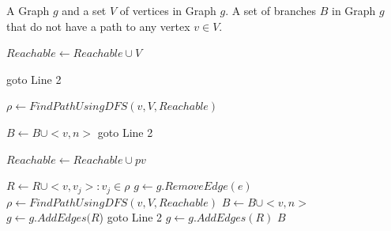 \newcommand{\UnrechableBranches}{\ensuremath{\mbox{\sc FindUnreachableBranches}}}
\begin{algorithm}[h!]
\caption{$FindUnreachableBranches(g, V)$}\label{alg:irrelavantBranches}
\begin{algorithmic}[1]
\REQUIRE A Graph $g$ and a set $V$ of vertices in Graph $g$.
\ENSURE A set of branches $B$ in Graph $g$ that do not have a path to any vertex $v \in V$.

\medskip

\STATE $Reachable \leftarrow Reachable \cup V$
  
  	\STATE goto Line 2
  \ENDIF
  
	\STATE $\rho \leftarrow FindPathUsingDFS(v, V, Reachable)$
	
			\STATE $B \leftarrow B \cup <v,n>$
		\ENDFOR
   	\STATE goto Line 2
	\ENDIF
		
		\STATE $Reachable \leftarrow Reachable \cup pv$
	\ENDFOR
	
	    \STATE $R \leftarrow R \cup <v, v_j>: v_j \in \rho$
			\STATE $g \leftarrow g.RemoveEdge(e)$
			\STATE $\rho \leftarrow FindPathUsingDFS(v, V, Reachable)$
						\STATE $B \leftarrow B \cup <v,n>$
					\ENDFOR
					\STATE $g \leftarrow g.AddEdges(R$)
					\STATE goto Line 2
			\ENDIF	
	\ENDFOR
	\STATE $g \leftarrow g.AddEdges(R)$	
\ENDFOR
\RETURN $B$
\label{alg:ICFG}
\end{algorithmic}
\end{algorithm}


